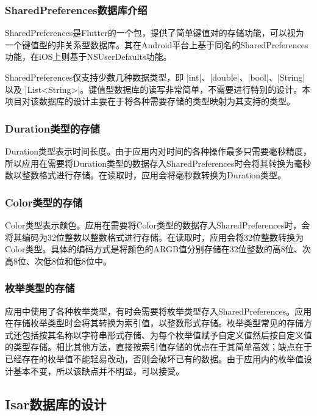 \subsubsection{SharedPreferences数据库介绍}\label{subsubsec:shared-preferences-intro}

SharedPreferences是Flutter的一个包，提供了简单键值对的存储功能，可以视为一个键值型的非关系型数据库。其在Android平台上基于同名的SharedPreferences功能，在iOS上则基于NSUserDefaults功能。

SharedPreferences仅支持少数几种数据类型，即 |int|、|double|、|bool|、|String| 以及 |List<String>|。键值型数据库的读写非常简单，不需要进行特别的设计。本项目对该数据库的设计主要在于将各种需要存储的类型映射为其支持的类型。

\subsubsection{Duration类型的存储}\label{subsubsec:duration-storage}

Duration类型表示时间长度。由于应用内对时间的各种操作最多只需要毫秒精度，所以应用在需要将Duration类型的数据存入SharedPreferences时会将其转换为毫秒数以整数格式进行存储。在读取时，应用会将毫秒数转换为Duration类型。

\subsubsection{Color类型的存储}\label{subsubsec:color-storage}

Color类型表示颜色。应用在需要将Color类型的数据存入SharedPreferences时，会将其编码为32位整数以整数格式进行存储。在读取时，应用会将32位整数转换为Color类型。具体的编码方式是将颜色的ARGB值分别存储在32位整数的高8位、次高8位、次低8位和低8位中。

\subsubsection{枚举类型的存储}\label{subsubsec:enum-storage}

应用中使用了各种枚举类型，有时会需要将枚举类型存入SharedPreferences。应用在存储枚举类型时会将其转换为索引值，以整数形式存储。枚举类型常见的存储方式还包括按其名称以字符串形式存储、为每个枚举值赋予自定义值然后按自定义值的类型存储。相比其他方法，直接按索引值存储的优点在于其简单高效；缺点在于已经存在的枚举值不能轻易改动，否则会破坏已有的数据。由于应用内的枚举值设计基本不变，所以该缺点并不明显，可以接受。

\subsection{Isar数据库的设计}\label{subsec:isar}

